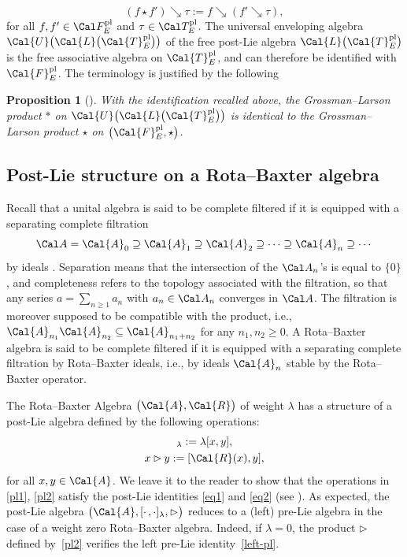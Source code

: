 \documentclass[10pt,a4paper]{amsart}
\numberwithin{equation}{section}
\newtheorem{Proposition}[Theorem]{Proposition}
 { \theoremstyle{definition}
\newtheorem{Definition}[Theorem]{Definition}
\newtheorem{Note}[Theorem]{Note}
\newtheorem{Example}[Theorem]{Example}
\newtheorem{Remark}[Theorem]{Remark} }
\begin{document}
\begin{equation*}
(f \star f') \searrow \tau := f \searrow (f' \searrow \tau),
\end{equation*}
for all $f,f'\in \Cal F_E^{\rm pl}$ and $\tau\in \Cal T_E^{\rm pl}$. The universal enveloping algebra $\Cal{U}\big(\Cal{L}\big(\Cal{T}^{\rm pl}_{E}\big)\big)$ of the free post-Lie algebra $\Cal{L}\big(\Cal{T}^{\rm pl}_E\big)$ is the free associative algebra on $\Cal{T}^{\rm pl}_{E}$, and can therefore be identified with $\Cal{F}^{\rm pl}_{E}$. The terminology is justified by the following

\begin{Proposition}[{\cite[Proposition 3.5]{ELM2015}}]
With the identification recalled above, the Grossman--Larson product $\ast$ on $\Cal{U}\big(\Cal{L}\big(\Cal{T}^{\rm pl}_{E}\big)\big)$
is identical to the Grossman--Larson product $\star$ on $\big(\Cal{F}^{\rm pl}_{E}, \star\big)$.
\end{Proposition}

\subsection{Post-Lie structure on a Rota--Baxter algebra}%

Recall that a unital algebra is said to be complete filtered if it is equipped with a separating complete filtration
\begin{displaymath}
\Cal A= \Cal{A}_0 \supseteq \Cal{A}_1 \supseteq
\Cal{A}_2 \supseteq \cdots \supseteq \Cal{A}_n \supseteq\cdots
\end{displaymath}
by ideals \cite{KLK04}. Separation means that the intersection of the $\Cal A_n$'s is equal to $\{0\}$, and completeness refers to the topology associated with the filtration, so that any series $a=\sum_{n\ge 1}a_n$ with $a_n\in\Cal A_n$ converges in $\Cal A$. The filtration is moreover supposed to be compatible with the product, i.e., $\Cal{A}_{n_1} \Cal{A}_{n_2}\subseteq \Cal{A}_{n_1 + n_2}$ for any $n_1,n_2\ge 0$. A Rota--Baxter algebra is said to be complete filtered if it is equipped with a separating complete filtration by Rota--Baxter ideals, i.e., by ideals $\Cal{A}_n$ stable by the Rota--Baxter operator.

The Rota--Baxter Algebra $\big(\Cal{A}, \Cal{R}\big)$ of weight $\lambda$ has a structure of a post-Lie algebra defined by the following operations:
\begin{gather}
[x, y]_{\lambda} := \lambda [x, y], \label{pl1}
\\
x \rhd y := [\Cal{R}(x), y] \label{pl2},
\end{gather}
for all $x, y \in \Cal{A}$. We leave it to the reader to show that the operations in \eqref{pl1}, \eqref{pl2} satisfy the post-Lie identities \eqref{eq1} and \eqref{eq2} (see \cite[Section~5.2]{BGN10}). As expected, the post-Lie algebra $\big(\Cal{A}, [\cdot\,, \cdot]_{\lambda}, \rhd \big)$ reduces to a (left) pre-Lie algebra in the case of a weight zero Rota--Baxter algebra. Indeed, if $\lambda =0$, the product $\rhd$ defined by~\eqref{pl2} verifies the left pre-Lie identity~\eqref{left-pl}.
\end{document}
